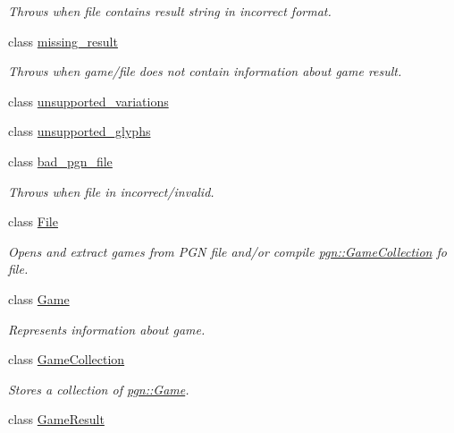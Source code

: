 \begin{DoxyCompactItemize}
\begin{DoxyCompactList}\small\item\em Throws when file contains result string in incorrect format. \item\end{DoxyCompactList}\item 
class \hyperlink{classpgn_1_1missing__result}{missing\_\-result}
\begin{DoxyCompactList}\small\item\em Throws when game/file does not contain information about game result. \item\end{DoxyCompactList}\item 
class \hyperlink{classpgn_1_1unsupported__variations}{unsupported\_\-variations}
\item 
class \hyperlink{classpgn_1_1unsupported__glyphs}{unsupported\_\-glyphs}
\item 
class \hyperlink{classpgn_1_1bad__pgn__file}{bad\_\-pgn\_\-file}
\begin{DoxyCompactList}\small\item\em Throws when file in incorrect/invalid. \item\end{DoxyCompactList}\item 
class \hyperlink{classpgn_1_1File}{File}
\begin{DoxyCompactList}\small\item\em Opens and extract games from PGN file and/or compile \hyperlink{classpgn_1_1GameCollection}{pgn::GameCollection} fo file. \item\end{DoxyCompactList}\item 
class \hyperlink{classpgn_1_1Game}{Game}
\begin{DoxyCompactList}\small\item\em Represents information about game. \item\end{DoxyCompactList}\item 
class \hyperlink{classpgn_1_1GameCollection}{GameCollection}
\begin{DoxyCompactList}\small\item\em Stores a collection of \hyperlink{classpgn_1_1Game}{pgn::Game}. \item\end{DoxyCompactList}\item 
class \hyperlink{classpgn_1_1GameResult}{GameResult}
\item 

\end{DoxyCompactItemize}
